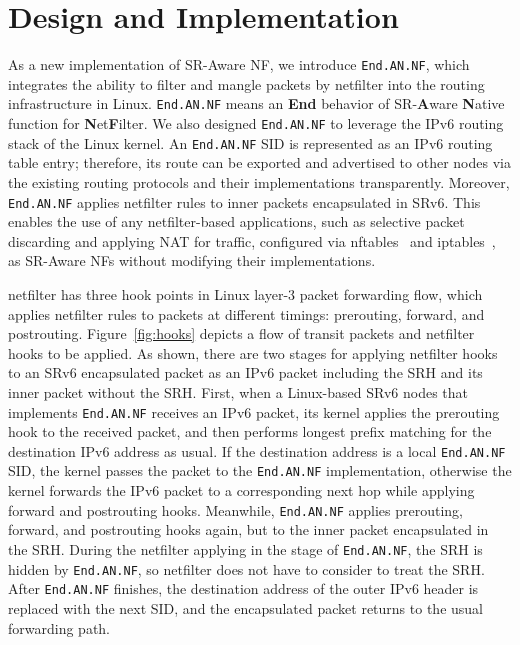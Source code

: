 \chapter{Design and Implementation}
\label{chap:design_and_impl}
As a new implementation of SR-Aware NF, we introduce \texttt{End.AN.NF}, which integrates the ability to filter and mangle packets by netfilter into the routing infrastructure in Linux.
\texttt{End.AN.NF} means an \textbf{End} behavior of SR-\textbf{A}ware \textbf{N}ative function for \textbf{N}et\textbf{F}ilter.
We also designed \texttt{End.AN.NF} to leverage the IPv6 routing stack of the Linux kernel. %
An \texttt{End.AN.NF} SID is represented as an IPv6 routing table entry; therefore, its route can be exported and advertised to other nodes via the existing routing protocols and their implementations transparently.
Moreover, \texttt{End.AN.NF} applies netfilter rules to inner packets encapsulated in SRv6.
This enables the use of any netfilter-based applications, such as selective packet discarding and applying NAT for traffic, configured via nftables~\cite{nftables} and iptables~\cite{iptables}, as SR-Aware NFs without modifying their implementations.

netfilter has three hook points in Linux layer-3 packet forwarding flow, which applies netfilter rules to packets at different timings: prerouting, forward, and postrouting.
Figure~\ref{fig:hooks} depicts a flow of transit packets and netfilter hooks to be applied.
As shown, there are two stages for applying netfilter hooks to an SRv6 encapsulated packet as an IPv6 packet including the SRH and its inner packet without the SRH.
First, when a Linux-based SRv6 nodes that implements \texttt{End.AN.NF} receives an IPv6 packet, its kernel applies the prerouting hook to the received packet, and then performs longest prefix matching for the destination IPv6 address as usual.
If the destination address is a local \texttt{End.AN.NF} SID, the kernel passes the packet to the \texttt{End.AN.NF} implementation, otherwise the kernel forwards the IPv6 packet to a corresponding next hop while applying forward and postrouting hooks.
Meanwhile, \texttt{End.AN.NF} applies prerouting, forward, and postrouting hooks again, but to the inner packet encapsulated in the SRH.
During the netfilter applying in the stage of \texttt{End.AN.NF}, the SRH is hidden by \texttt{End.AN.NF}, so netfilter does not have to consider to treat the SRH.%
After \texttt{End.AN.NF} finishes, the destination address of the outer IPv6 header is replaced with the next SID, and the encapsulated packet returns to the usual forwarding path.

